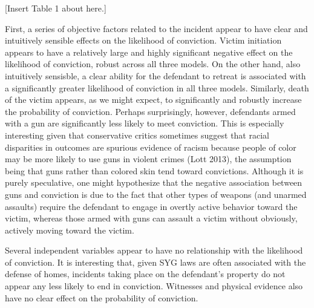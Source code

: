 \documentclass[12pt,article]{article}
\begin{document}
\begin{center}[Insert Table 1 about here.]\end{center}

First, a series of objective factors related to the incident appear to
have clear and intuitively sensible effects on the likelihood of
conviction. Victim initiation appears to have a relatively large and
highly significant negative effect on the likelihood of conviction,
robust across all three models. On the other hand, also intuitively
sensisble, a clear ability for the defendant to retreat is associated
with a significantly greater likelihood of conviction in all three
models. Similarly, death of the victim appears, as we might expect, to
significantly and robustly increase the probability of conviction.
Perhaps surprisingly, however, defendants armed with a gun are
significantly less likely to meet conviction. This is especially
interesting given that conservative critics sometimes suggest that
racial disparities in outcomes are spurious evidence of racism because
people of color may be more likely to use guns in violent crimes (Lott
2013), the assumption being that guns rather than colored skin tend
toward convictions. Although it is purely speculative, one might
hypothesize that the negative association between guns and conviction is
due to the fact that other types of weapons (and unarmed assaults)
require the defendant to engage in overtly active behavior toward the
victim, whereas those armed with guns can assault a victim without
obviously, actively moving toward the victim.

Several independent variables appear to have no relationship with the
likelihood of conviction. It is interesting that, given SYG laws are
often associated with the defense of homes, incidents taking place on
the defendant's property do not appear any less likely to end in
conviction. Witnesses and physical evidence also have no clear effect on
the probability of conviction.
\end{document}
